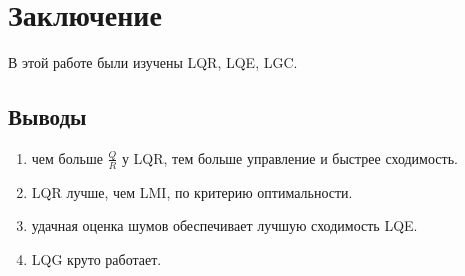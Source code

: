 \documentclass[16pt]{article}
\begin{document}

\FloatBarrier

\newpage
\section{Заключение}
В этой работе были изучены LQR, LQE, LGC.
\subsection{Выводы}
\begin{enumerate}
   \item чем больше \(\frac{Q}{R}\) у LQR, тем больше управление и быстрее сходимость.
   \item LQR лучше, чем LMI, по критерию оптимальности.
   \item удачная оценка шумов обеспечивает лучшую сходимость LQE.
   \item LQG круто работает.
\end{enumerate}
\end{document}
